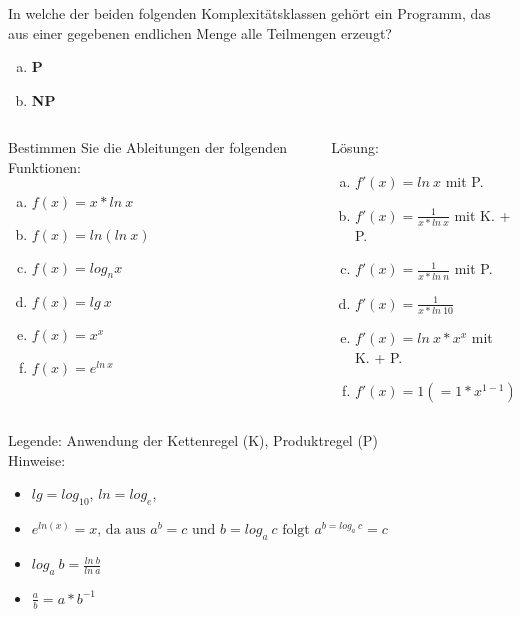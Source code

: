\begin{card}
	In welche der beiden folgenden Komplexitätsklassen gehört ein Programm, das aus einer
	gegebenen endlichen Menge alle Teilmengen erzeugt?
	\begin{enumerate}[a)]
	\item \textbf{P}
	\item \textbf{NP}
	\end{enumerate}
	\hr
\end{card}

\begin{card}
	\begin{columns}
		\begin{column}{.5\linewidth}
		Bestimmen Sie die Ableitungen der folgenden Funktionen:
			\begin{enumerate}[a)]
			\item $f(x) = x * ln~x$
			\item $f(x) = ln ( ln~x)$
			\item $f(x) = log_n x$
			\item $f(x) = lg~x$
			\item $f(x) = x^x$
			\item $f(x) = e^{ln~x}$
			\end{enumerate}
		\end{column}
		\begin{column}{.5\linewidth}
		Lösung:
			\begin{enumerate}[a)]
			\item $f'(x) = ln~x$ mit P.
			\item $f'(x) = \frac{1}{x*ln~x}$ mit K. + P.
			\item $f'(x) = \frac{1}{x*ln~n}$ mit P.
			\item $f'(x) = \frac{1}{x*ln~10}$
			\item $f'(x) = ln~x*x^x$ mit K. + P.
			\item $f'(x) = 1 (= 1 * x^{1-1})$
			\end{enumerate}
		\end{column}
	\end{columns}
	\vfill	
	Legende: Anwendung der Kettenregel (K), Produktregel (P)\\
	Hinweise:\\
	\begin{itemize}
	\item $lg = log_{10}$, $ln = log_e$,
	\item $e^{ln(x)} = x \text{, da aus } a^b = c \text{ und } b = log_a~c \text{ folgt } a^{b = log_a~c} = c$
	\item $log_a~b = \frac{ln~b}{ln~a}$
	\item $\frac{a}{b} = a * b^{-1}$
	\end{itemize}
\end{card}

